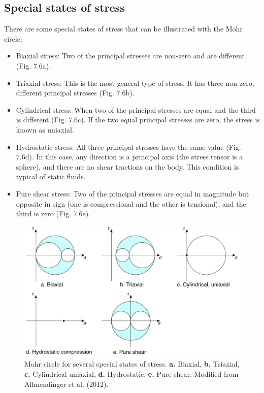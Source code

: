 \documentclass[a4paper , 12pt]{book}
\begin{document}
\subsection {Special states of stress}

There are some special states of stress that can be illustrated with the Mohr circle:

\begin{itemize}
    \item Biaxial stress: Two of the principal stresses are non-zero and are different (Fig. 7.6a).
    \item Triaxial stress: This is the most general type of stress. It has three non-zero, different principal stresses (Fig. 7.6b).
    \item Cylindrical stress: When two of the principal stresses are equal and the third is different (Fig. 7.6c). If the two equal principal stresses are zero, the stress is known as uniaxial.
    \item Hydrostatic stress: All three principal stresses have the same value (Fig. 7.6d). In this case, any direction is a principal axis (the stress tensor is a sphere), and there are no shear tractions on the body. This condition is typical of static fluids.
    \item Pure shear stress: Two of the principal stresses are equal in magnitude but opposite in sign (one is compressional and the other is tensional), and the third is zero (Fig. 7.6e).
\end{itemize}

\begin{figure}[ht]
    \centering
    \includegraphics[width=14cm]{ch7f6.pdf}
    \caption{Mohr circle for several special states of stress. \textbf{a.} Biaxial, \textbf{b.} Triaxial, \textbf{c.} Cylindrical uniaxial, \textbf{d.} Hydrostatic, \textbf{e.} Pure shear. Modified from Allmendinger et al. (2012).} 
\end{figure}
\end{document}
